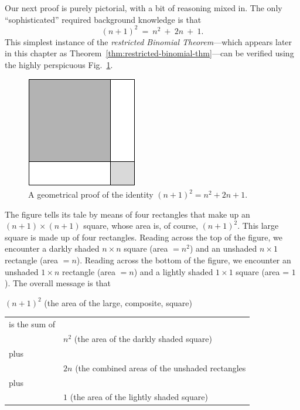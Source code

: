 Our next proof is purely pictorial, with a bit of reasoning mixed in.
The only ``sophisticated'' required background knowledge is that
\[ (n+1)^2 \ = \ n^2 \ + \ 2n \ + \ 1. \]
This simplest instance of the {\em restricted Binomial
  Theorem}---which appears later in this chapter as
Theorem~\ref{thm:restricted-binomial-thm}---can be verified using the
highly perspicuous Fig.~\ref{fig:proofa2plusb2}.
\begin{figure}[h]
\begin{center}
       \includegraphics[scale=0.4]{FiguresMaths/proofa2plusb2}
\caption{A geometrical proof of the identity $(n+1)^2 = n^2 + 2n + 1$.}
       \label{fig:proofa2plusb2}
\end{center}
\end{figure}
The figure tells its tale by means of four rectangles that make up an
$(n+1) \times (n+1)$ square, whose area is, of course, $(n+1)^2$.
This large square is made up of four rectangles.  Reading across the
top of the figure, we encounter a darkly shaded $n \times n$ square
(area $= n^2$) and an unshaded $n \times 1$ rectangle (area $= n$).
Reading across the bottom of the figure, we encounter an unshaded $1
\times n$ rectangle (area $= n$) and a lightly shaded $1 \times 1$
square (area = $1$).  The overall message is that

\noindent
$(n+1)^2$ (the area of the large, composite, square)

\begin{tabular}{ll}
is the sum of & \\
  & $n^2$ (the area of the darkly shaded square) \\
plus & \\
  & $2n$ (the combined areas of the unshaded rectangles \\
plus & \\
  & $1$ (the area of the lightly shaded square)
\end{tabular}

